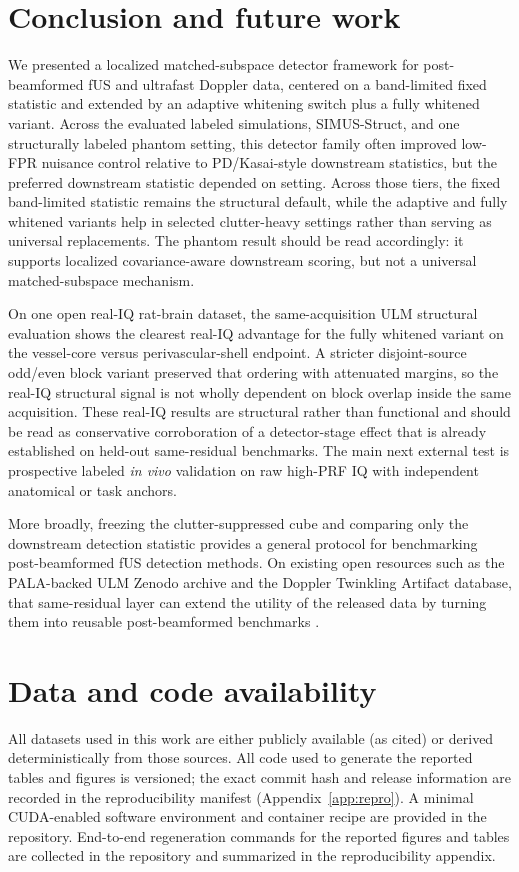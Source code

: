 \documentclass[11pt]{article}
\newif\ifPAPERONLY
\newcommand{\SuppOrApp}[1]{\ifPAPERONLY Supplementary Material\else Appendix~\ref{#1}\fi}
\begin{document}
\section{Conclusion and future work}
We presented a localized matched-subspace detector framework for post-beamformed fUS and ultrafast Doppler data, centered on a band-limited fixed statistic and extended by an adaptive whitening switch plus a fully whitened variant. Across the evaluated labeled simulations, SIMUS-Struct, and one structurally labeled phantom setting, this detector family often improved low-FPR nuisance control relative to PD/Kasai-style downstream statistics, but the preferred downstream statistic depended on setting. Across those tiers, the fixed band-limited statistic remains the structural default, while the adaptive and fully whitened variants help in selected clutter-heavy settings rather than serving as universal replacements. The phantom result should be read accordingly: it supports localized covariance-aware downstream scoring, but not a universal matched-subspace mechanism.

On one open real-IQ rat-brain dataset, the same-acquisition ULM structural evaluation shows the clearest real-IQ advantage for the fully whitened variant on the vessel-core versus perivascular-shell endpoint. A stricter disjoint-source odd/even block variant preserved that ordering with attenuated margins, so the real-IQ structural signal is not wholly dependent on block overlap inside the same acquisition. These real-IQ results are structural rather than functional and should be read as conservative corroboration of a detector-stage effect that is already established on held-out same-residual benchmarks. The main next external test is prospective labeled \emph{in vivo} validation on raw high-PRF IQ with independent anatomical or task anchors.

More broadly, freezing the clutter-suppressed cube and comparing only the downstream detection statistic provides a general protocol for benchmarking post-beamformed fUS detection methods. On existing open resources such as the PALA-backed ULM Zenodo archive and the Doppler Twinkling Artifact database, that same-residual layer can extend the utility of the released data by turning them into reusable post-beamformed benchmarks \cite{ChavignonZenodo7883227,HeilesULMBenchmark2021,LeonovTwinklingDD2021}.

\section*{Data and code availability}
All datasets used in this work are either publicly available (as cited) or derived deterministically from those sources. All code used to generate the reported tables and figures is versioned; the exact commit hash and release information are recorded in the reproducibility manifest (\SuppOrApp{app:repro}). A minimal CUDA-enabled software environment and container recipe are provided in the repository. End-to-end regeneration commands for the reported figures and tables are collected in the repository and summarized in the reproducibility appendix.
\end{document}
